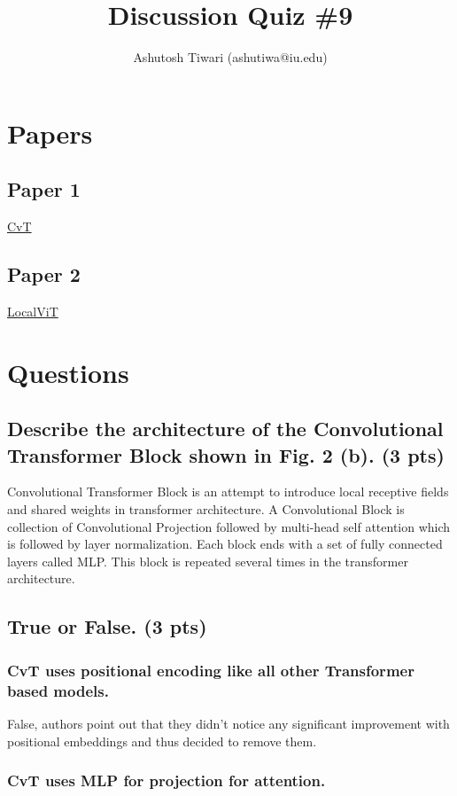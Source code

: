 \documentclass{article}
\title{\textbf{Discussion Quiz \#9}}
\author{{Ashutosh Tiwari (ashutiwa@iu.edu)}}
\begin{document}
\maketitle

\section{Papers}
\subsection{Paper 1}
    \href{https://arxiv.org/pdf/2103.15808.pdf}{CvT}
\subsection{Paper 2}
    \href{https://arxiv.org/pdf/2104.05707.pdf}{LocalViT}

\section{Questions}

\subsection{Describe the architecture of the Convolutional Transformer Block shown in Fig. 2 (b). (3 pts)}

Convolutional Transformer Block is an attempt to introduce local receptive fields and shared weights in transformer architecture. A Convolutional Block is collection of Convolutional Projection followed by multi-head self attention which is followed by layer normalization. Each block ends with a set of fully connected layers called MLP. This block is repeated several times in the transformer architecture.

\subsection{True or False. (3 pts)}
\subsubsection{CvT uses positional encoding like all other Transformer based models.}

False, authors point out that they didn't notice any significant improvement with positional embeddings and thus decided to remove them.

\subsubsection{CvT uses MLP for projection for attention.}
\end{document}
